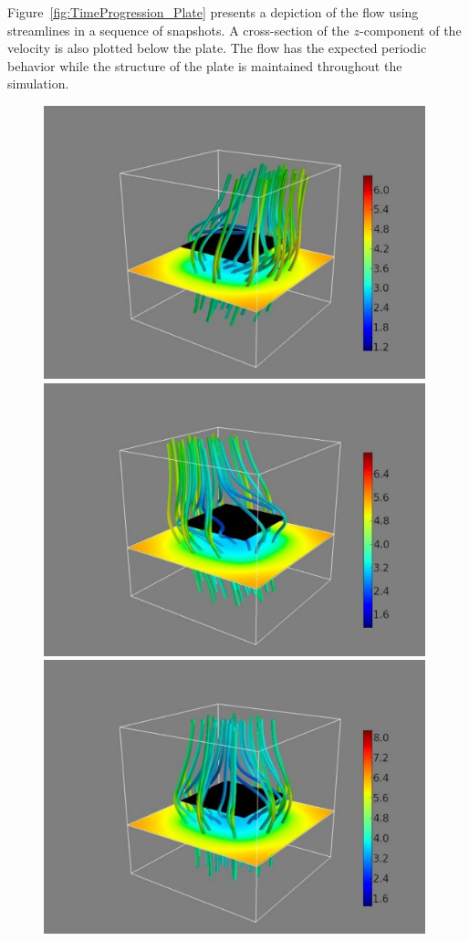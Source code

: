 Figure~\ref{fig:TimeProgression_Plate} presents a depiction of the flow using streamlines in a sequence of snapshots. A cross-section of the
 $z$-component of the velocity is also plotted below the plate. The flow has the expected periodic behavior while the structure of the plate is maintained throughout the simulation.
 \begin{figure}[htb]
	\begin{center}
		\includegraphics[bb=.0in .4in 11.5in 6.1in,width=4.355in,clip]{Images_Methodology/3dplot_50c.pdf}
		\hfill
		\includegraphics[bb=.0in .4in 11.5in 6.1in,width=4.35in,clip]{Images_Methodology/3dplot_72c.pdf}
		\hfill
		\includegraphics[bb=.0in .4in 11.5in 6.1in,width=4.355in,clip]{Images_Methodology/3dplot_104c.pdf}

\end{center}
\end{figure}
